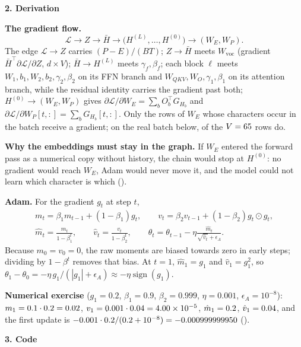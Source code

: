 \documentclass[11pt,a4paper]{article}
\numberwithin{equation}{section}
\newcommand{\T}{^{\top}}
\newcommand{\Wvoc}{W_{\mathrm{voc}}}
\newcommand{\Hbar}{\bar H}
\DeclareRobustCommand{\code}[1]{\texttt{\detokenize{#1}}}
\newcommand{\stephead}[1]{\par\smallskip\noindent\textbf{\small #1}\par\nobreak}
\begin{document}
\stephead{2. Derivation}
\textbf{The gradient flow.}
\begin{equation}
\mathcal L\longrightarrow Z\longrightarrow\Hbar\longrightarrow\big(H^{(L)},\dots,H^{(0)}\big)\longrightarrow(W_E,W_P).
\end{equation}
The edge $\mathcal L\to Z$ carries $(P-E)/(BT)$; $Z\to\Hbar$ meets $\Wvoc$ (gradient $\Hbar\T\partial\mathcal L/\partial Z$,
$d\times V$); $\Hbar\to H^{(L)}$ meets $\gamma_f,\beta_f$; each block $\ell$ meets $W_1,b_1,W_2,b_2,\gamma_2,\beta_2$ on its FFN
branch and $W_{QKV},W_O,\gamma_1,\beta_1$ on its attention branch, while the residual identity carries the gradient past both;
$H^{(0)}\to(W_E,W_P)$ gives $\partial\mathcal L/\partial W_E=\sum_bO_b\T G_{H_b}$ and
$\partial\mathcal L/\partial W_P[t,:]=\sum_bG_{H_b}[t,:]$. Only the rows of $W_E$ whose characters occur in the batch receive
a gradient; on the real batch below, \WErowsHit{} of the $V=65$ rows do.

\textbf{Why the embeddings must stay in the graph.} If $W_E$ entered the forward pass as a numerical copy without history,
the chain would stop at $H^{(0)}$: no gradient would reach $W_E$, Adam would never move it, and the model could not learn
which character is which (\code{Q3.6}).

\textbf{Adam.} For the gradient $g_t$ at step $t$,
\begin{gather}
m_t=\beta_1m_{t-1}+(1-\beta_1)g_t,\qquad v_t=\beta_2v_{t-1}+(1-\beta_2)g_t\odot g_t,\\
\hat m_t=\frac{m_t}{1-\beta_1^t},\qquad\hat v_t=\frac{v_t}{1-\beta_2^t},\qquad
\theta_t=\theta_{t-1}-\eta\frac{\hat m_t}{\sqrt{\hat v_t}+\epsilon_A}.
\end{gather}
Because $m_0=v_0=0$, the raw moments are biased towards zero in early steps; dividing by $1-\beta^t$ removes that bias. At
$t=1$, $\hat m_1=g_1$ and $\hat v_1=g_1^2$, so $\theta_1-\theta_0=-\eta\,g_1/(|g_1|+\epsilon_A)\approx-\eta\operatorname{sign}(g_1)$.

\textbf{Numerical exercise} ($g_1=0.2$, $\beta_1=0.9$, $\beta_2=0.999$, $\eta=0.001$, $\epsilon_A=10^{-8}$):
$m_1=0.1\cdot0.2=0.02$, $v_1=0.001\cdot0.04=4.00\times10^{-5}$, $\hat m_1=0.2$, $\hat v_1=0.04$, and the first update is
$-0.001\cdot0.2/(0.2+10^{-8})=-0.000999999950$ (\code{Q3.1}).

\stephead{3. Code}





\end{document}
